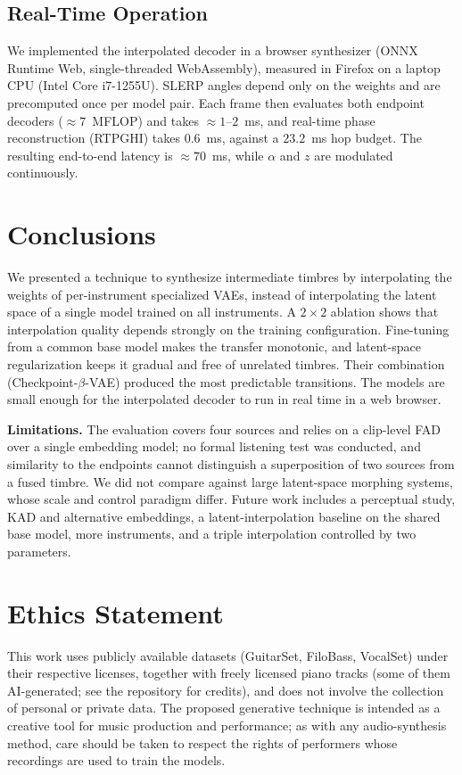 \documentclass{article}
\begin{document}
\subsection{Real-Time Operation}
We implemented the interpolated decoder in a browser synthesizer (ONNX Runtime
Web, single-threaded WebAssembly), measured in Firefox on a laptop CPU (Intel
Core i7-1255U). SLERP angles depend only on the weights and are
precomputed once per model pair. Each frame then evaluates both endpoint decoders
($\approx7$~MFLOP) and takes $\approx1$--$2$~ms, and real-time phase reconstruction
(RTPGHI) takes $0.6$~ms, against a $23.2$~ms hop budget. The resulting
end-to-end latency is $\approx70$~ms, while $\alpha$ and $z$ are modulated
continuously.

\section{Conclusions}\label{sec:conclusions}

We presented a technique to synthesize intermediate timbres by interpolating the
weights of per-instrument specialized VAEs, instead of interpolating the latent
space of a single model trained on all instruments. A $2\times2$ ablation shows
that interpolation quality depends strongly on the training configuration.
Fine-tuning from a common base model makes the transfer monotonic, and
latent-space regularization keeps it gradual and free of unrelated timbres.
Their combination (Checkpoint-$\beta$-VAE) produced the most predictable
transitions. The models are small enough for the interpolated decoder to run in
real time in a web browser.

\noindent\textbf{Limitations.} The evaluation covers four sources and relies on a
clip-level FAD over a single embedding model; no formal listening test was
conducted, and similarity to the endpoints cannot distinguish a superposition of
two sources from a fused timbre. We did not compare against large latent-space
morphing systems, whose scale and control paradigm differ. Future work includes
a perceptual study, KAD \cite{chung2025kad} and alternative embeddings, a
latent-interpolation baseline on the shared base model, more instruments, and a
triple interpolation controlled by two parameters.

\section{Ethics Statement}

This work uses publicly available datasets (GuitarSet, FiloBass, VocalSet) under
their respective licenses, together with freely licensed piano tracks (some of
them AI-generated; see the repository for credits), and does
not involve the collection of personal or private data. The proposed generative
technique is intended as a creative tool for music production and performance;
as with any audio-synthesis method, care should be taken to respect the rights
of performers whose recordings are used to train the models.


\end{document}
